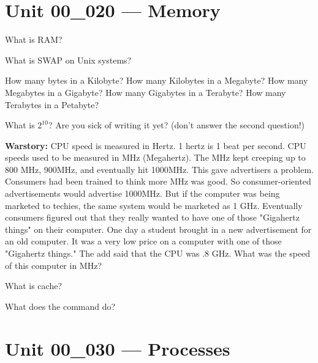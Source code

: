 \documentclass[letterpaper,12pt]{exam}
\newcommand{\unit}{Unit 00}
\begin{document}
\begin {questions}
\section*{\unit\_020 --- Memory}

\begin{samepage}
\question What is RAM? 
\vspace{5mm}
\end{samepage}

\question What is SWAP on Unix systems?
\begin{samepage}
\question How many bytes in a Kilobyte?
\question How many Kilobytes in a Megabyte?
\question How many Megabytes in a Gigabyte?
\question How many Gigabytes in a Terabyte?
\question How many Terabytes in a Petabyte?
\end{samepage}

\question What is $2^{10}$?  Are you sick of writing it yet? (don't answer the second question!)
\vspace{20mm}
\begin {samepage}

\noindent \textbf{Warstory:}  CPU speed is measured in Hertz.  1 hertz is 1 beat per second.  CPU speeds used to be measured in MHz (Megahertz).  The MHz kept creeping up to 800 MHz, 900MHz, and eventually hit 1000MHz.  This gave advertisers a problem.  Consumers had been trained to think more MHz was good.  So consumer-oriented advertisements would advertise 1000MHz.  But if the computer was being marketed to techies, the same system would be marketed as 1 GHz.  Eventually consumers figured out that they really wanted to have one of those "Gigahertz things" on their computer.  
\question One day a student brought in a new advertisement for an old computer.  It was a very low price on a computer with one of those "Gigahertz things."  The add said that the CPU was .8 GHz.   What was the speed of this computer in MHz?
\vspace{15mm}

\end{samepage}
\begin{samepage}
\question What is cache?  
\vspace{5mm}
\end{samepage}

\question What does the  command do?

\section*{\unit\_030 --- Processes}


\end{questions}
\end{document}
